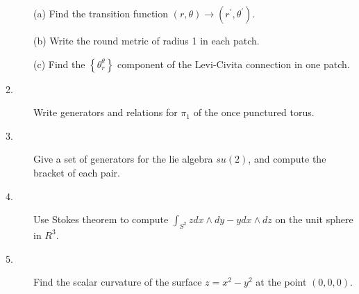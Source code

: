 \documentclass{article}
\begin{document}
\begin{description}
\item[\quad] (a)
Find the transition function $(r, \theta) \to (r^\prime, \theta^\prime)$.

\item[\quad] (b)
Write the round metric of radius 1 in each patch.

\item[\quad] (c)
Find the $\left\{ \theta^\theta_r \right\}$ component of the Levi-Civita
connection in one patch.

\item[2.]
Write generators and relations for $\pi_1$ of the once punctured torus.

\item[3.]
Give a set of generators for the lie algebra $su(2)$, and compute the
bracket of each pair.

\item[4.]
Use Stokes theorem to compute $\int_{S^2} zdx \wedge dy - ydx \wedge dz$
on the unit sphere in $R^3$.

\item[5.]
Find the scalar curvature of the surface $z=x^2-y^2$ at the point
$(0,0,0)$.



\end{description}    
\end{document}
